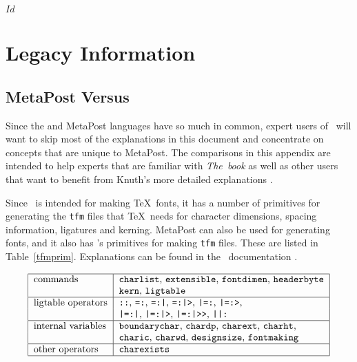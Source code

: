 \svnInfo $Id$
\section{Legacy Information}
\label{legacy}

\subsection{MetaPost Versus \MF}
\label{MPvsMF}

Since the \MF{} and MetaPost languages have so much in
common, expert users of \MF\ will want to skip most of the explanations
in this document and concentrate on concepts that are unique to
MetaPost.  The comparisons in this appendix are intended to help experts
that are familiar with {\sl The\ \MF book} as well as other users that
want to benefit from Knuth's more detailed explanations \cite{kn:c}.

Since \MF\ is intended for making \TeX\ fonts, it has a number of
primitives for generating the {\tt tfm} files that \TeX\ needs for character
dimensions, spacing information, ligatures and
kerning.  MetaPost can also be used for generating fonts,
and it also has \MF's primitives for making {\tt tfm} files.  These are
listed in Table~\ref{tfmprim}.  Explanations can be found in the \MF\
documentation \cite{kn:c,kn:mf3}.

\begin{table}[htp]
$$\begin{tabular}{|l|l|}  \hline
commands&               {\tt charlist}, {\tt extensible},
                        {\tt fontdimen}, {\tt headerbyte}               \\
        &               {\tt kern}, {\tt ligtable}                      \\ \hline
ligtable operators&     \verb!::!, \verb!=:!, \verb!=:|!, \verb!=:|>!,
                        \verb!|=:!, \verb!|=:>!,                        \\
        &               \verb!|=:|!, \verb!|=:|>!, \verb!|=:|>>!,
                        \verb!||:!                                      \\ \hline
internal variables\index{internal variables}\index{variables!internal}&
                        {\tt boundarychar}, {\tt chardp},
                        {\tt charext}, {\tt charht},                    \\
        &               {\tt charic}, {\tt charwd},
                        {\tt designsize}, {\tt fontmaking}              \\ \hline
other operators&        {\tt charexists}                                \\ \hline
\end{tabular}
$$
\caption{MetaPost primitives for making {\tt tfm} files.}
\label{tfmprim}
\end{table}

